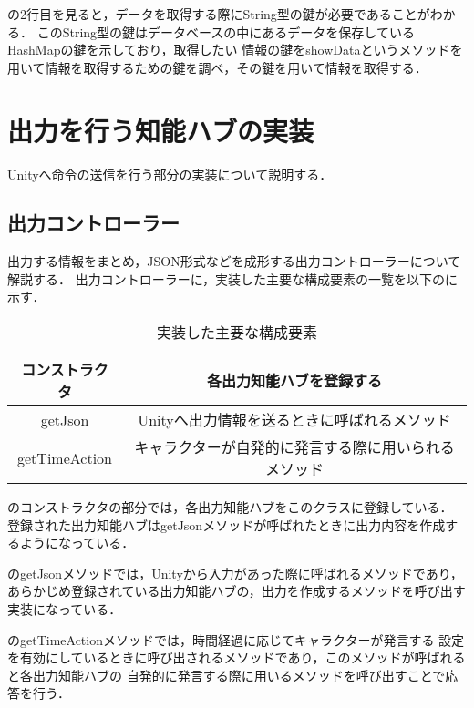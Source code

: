 
の2行目を見ると，データを取得する際にString型の鍵が必要であることがわかる．
このString型の鍵はデータベースの中にあるデータを保存しているHashMapの鍵を示しており，取得したい
情報の鍵をshowDataというメソッドを用いて情報を取得するための鍵を調べ，その鍵を用いて情報を取得する．


\section{出力を行う知能ハブの実装}
Unityへ命令の送信を行う部分の実装について説明する．

\subsection{出力コントローラー}
出力する情報をまとめ，JSON形式などを成形する出力コントローラーについて解説する．
出力コントローラーに，実装した主要な構成要素の一覧を以下のに示す．

\begin{table}[tbh]
	\caption{実装した主要な構成要素} \label{tab:OutputController}
	\begin{center}
		\begin{tabular}[htb]{c|c}
		\hline
		コンストラクタ & 各出力知能ハブを登録する \\
		\hline
		getJson & Unityへ出力情報を送るときに呼ばれるメソッド \\
		\hline
		getTimeAction & キャラクターが自発的に発言する際に用いられるメソッド \\
		\hline
		\end{tabular}
	\end{center}
\end{table}

のコンストラクタの部分では，各出力知能ハブをこのクラスに登録している．
登録された出力知能ハブはgetJsonメソッドが呼ばれたときに出力内容を作成するようになっている．

のgetJsonメソッドでは，Unityから入力があった際に呼ばれるメソッドであり，
あらかじめ登録されている出力知能ハブの，出力を作成するメソッドを呼び出す実装になっている．

のgetTimeActionメソッドでは，時間経過に応じてキャラクターが発言する
設定を有効にしているときに呼び出されるメソッドであり，このメソッドが呼ばれると各出力知能ハブの
自発的に発言する際に用いるメソッドを呼び出すことで応答を行う．

